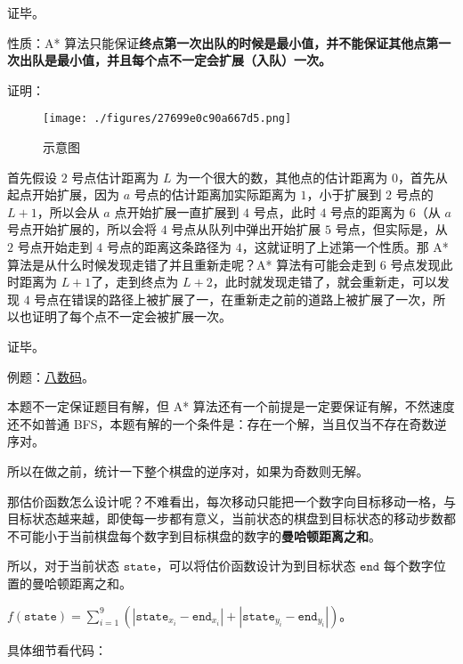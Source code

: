 证毕。

性质：A* 算法只能保证\textbf{终点第一次出队的时候是最小值，并不能保证其他点第一次出队是最小值，并且每个点不一定会扩展（入队）一次。}

证明：

\begin{figure}[ht]
\centering
\texttt{[image: ./figures/27699e0c90a667d5.png]}
\caption{示意图} \label{fig_Astar_1}
\end{figure}

首先假设 $2$ 号点估计距离为 $L$ 为一个很大的数，其他点的估计距离为 $0$，首先从起点开始扩展，因为 $a$ 号点的估计距离加实际距离为 $1$，小于扩展到 $2$ 号点的 $L + 1$，所以会从 $a$ 点开始扩展一直扩展到 $4$ 号点，此时 $4$ 号点的距离为 $6$（从 $a$ 号点开始扩展的，所以会将 $4$ 号点从队列中弹出开始扩展 $5$ 号点，但实际是，从 $2$ 号点开始走到 $4$ 号点的距离这条路径为 $4$，这就证明了上述第一个性质。那 A* 算法是从什么时候发现走错了并且重新走呢？A* 算法有可能会走到 $6$ 号点发现此时距离为 $L + 1$了，走到终点为 $L + 2$，此时就发现走错了，就会重新走，可以发现 $4$ 号点在错误的路径上被扩展了一，在重新走之前的道路上被扩展了一次，所以也证明了每个点不一定会被扩展一次。 

证毕。

例题：\href{http://poj.org/problem?id=1077}{八数码}。

本题不一定保证题目有解，但 A* 算法还有一个前提是一定要保证有解，不然速度还不如普通 BFS，本题有解的一个条件是：存在一个解，当且仅当不存在奇数逆序对。

所以在做之前，统计一下整个棋盘的逆序对，如果为奇数则无解。

那估价函数怎么设计呢？不难看出，每次移动只能把一个数字向目标移动一格，与目标状态越来越，即使每一步都有意义，当前状态的棋盘到目标状态的移动步数都不可能小于当前棋盘每个数字到目标棋盘的数字的\textbf{曼哈顿距离之和}。

所以，对于当前状态 $\texttt{state}$，可以将估价函数设计为到目标状态 $\texttt{end}$ 每个数字位置的曼哈顿距离之和。

$f(\texttt{state}) = \sum^9_{i = 1}(|\texttt{state}_{x_{i}} - \texttt{end}_{x_{i}}| + |\texttt{state}_{y_{i}} - \texttt{end}_{y_{i}}|)$。

具体细节看代码：

